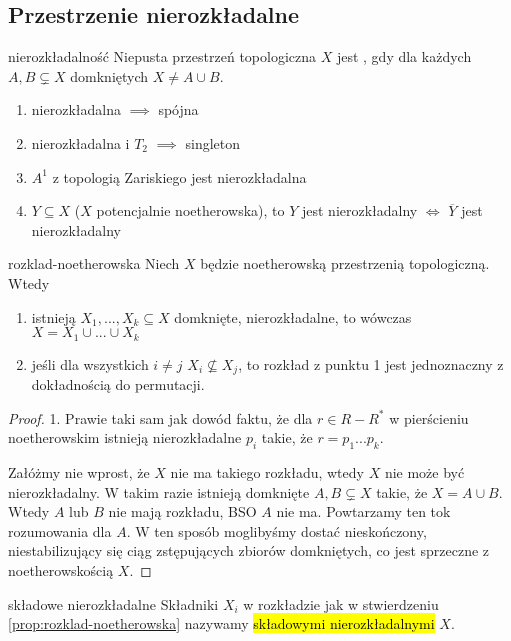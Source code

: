 \subsection{Przestrzenie nierozkładalne}

\begin{definition}{nierozkładalność}{}
  Niepusta przestrzeń topologiczna $X$ jest , gdy dla każdych $A, B\subsetneq X$ domkniętych $X\neq A\cup B$.
\end{definition}

\begin{remark}{}{}
  \begin{enumerate}
    \item nierozkładalna $\implies$ spójna
    \item nierozkładalna i $T_2$ $\implies$ singleton
    \item $A^1$ z topologią Zariskiego jest nierozkładalna
    \item $Y\subseteq X$ ($X$ potencjalnie noetherowska), to $Y$ jest nierozkładalny $\iff$ $\overline{Y}$ jest nierozkładalny
  \end{enumerate}
\end{remark}

\begin{proposition}{}{rozklad-noetherowska}
  Niech $X$ będzie noetherowską przestrzenią topologiczną. Wtedy 
  \begin{enumerate}
    \item istnieją $X_1,..., X_k\subseteq X$ domknięte, nierozkładalne, to wówczas $X=X_1\cup...\cup X_k$
    \item jeśli dla wszystkich $i\neq j$ $X_i\not\subseteq X_j$, to rozkład z punktu 1 jest jednoznaczny z dokładnością do permutacji.
  \end{enumerate}
\end{proposition}

\begin{proof}
  1. Prawie taki sam jak dowód faktu, że dla $r\in R-R^*$ w pierścieniu noetherowskim istnieją nierozkładalne $p_i$ takie, że $r=p_1...p_k$.

  Załóżmy nie wprost, że $X$ nie ma takiego rozkładu, wtedy $X$ nie może być nierozkładalny. W takim razie istnieją domknięte $A, B\subsetneq X$ takie, że $X=A\cup B$. Wtedy $A$ lub $B$ nie mają rozkładu, BSO $A$ nie ma. Powtarzamy ten tok rozumowania dla $A$. W ten sposób moglibyśmy dostać nieskończony, niestabilizujący się ciąg zstępujących zbiorów domkniętych, co jest sprzeczne z noetherowskością $X$.
\end{proof}

\begin{definition}{składowe nierozkładalne}{}
  Składniki $X_i$ w rozkładzie jak w stwierdzeniu \ref{prop:rozklad-noetherowska} nazywamy \hl{składowymi nierozkładalnymi} $X$.
\end{definition}

